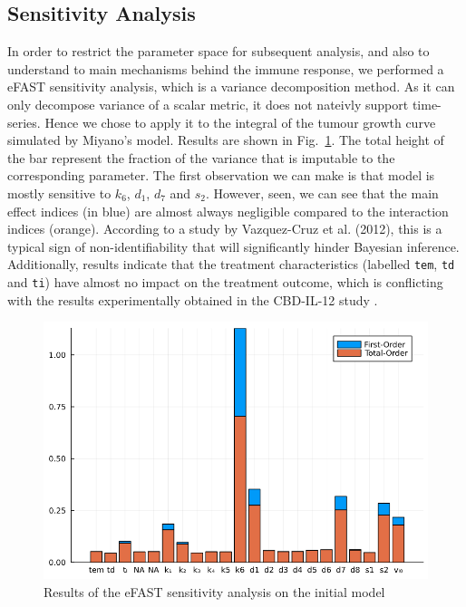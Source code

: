 \documentclass[11pt]{article}
\begin{document}
\subsection{Sensitivity Analysis}
In order to restrict the parameter space for subsequent analysis, and also to understand to main mechanisms behind the immune response, we performed a eFAST sensitivity analysis, which is a variance decomposition method. As it can only decompose variance of a scalar metric, it does not nateivly support time-series. Hence we chose to apply it to the integral of the tumour growth curve simulated by Miyano's model. Results are shown in Fig.~\ref{fig:efast}. The total height of the bar represent the fraction of the variance that is imputable to the corresponding parameter. The first observation we can make is that model is mostly sensitive to $k_6$, $d_1$, $d_7$ and $s_2$. However, seen, we can see that the main effect indices (in blue) are almost always negligible compared to the interaction indices (orange). According to a study by Vazquez-Cruz et al. (2012), this is a typical sign of non-identifiability \cite{tomgro} that will significantly hinder Bayesian inference. Additionally, results indicate that the treatment characteristics (labelled \verb+tem+, \verb+td+ and \verb+ti+) have almost no impact on the treatment outcome, which is conflicting with the results experimentally obtained in the CBD-IL-12 study \cite{cbdil12}. 

\begin{figure}[!ht]
    \centering\includegraphics[scale=0.4]{Images/batch2/eFAST_old.png}
    \caption{Results of the eFAST sensitivity analysis on the initial model}
    \label{fig:efast}
\end{figure}
\end{document}
